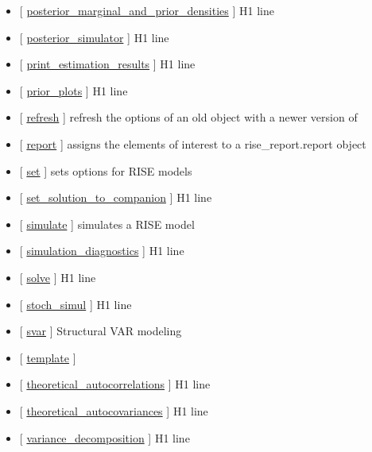\documentclass[letterpaper,10pt,english]{sphinxmanual}
\begin{document}
\begin{itemize}
\item {} 
{[} {\hyperref[classes/models/@svar/svar:posterior-marginal-and-prior-densities]{posterior\_marginal\_and\_prior\_densities}} {]}   H1 line

\item {} 
{[} {\hyperref[classes/models/@svar/svar:posterior-simulator]{posterior\_simulator}} {]}   H1 line

\item {} 
{[} {\hyperref[classes/models/@svar/svar:print-estimation-results]{print\_estimation\_results}} {]}   H1 line

\item {} 
{[} {\hyperref[classes/models/@svar/svar:prior-plots]{prior\_plots}} {]}   H1 line

\item {} 
{[} {\hyperref[classes/models/@svar/svar:refresh]{refresh}} {]}  refresh the options of an old object with a newer version of

\item {} 
{[} {\hyperref[classes/models/@svar/svar:report]{report}} {]} assigns the elements of interest to a rise\_report.report object

\item {} 
{[} {\hyperref[classes/models/@svar/svar:set]{set}} {]}  sets options for RISE models

\item {} 
{[} {\hyperref[classes/models/@svar/svar:set-solution-to-companion]{set\_solution\_to\_companion}} {]}   H1 line

\item {} 
{[} {\hyperref[classes/models/@svar/svar:simulate]{simulate}} {]}  simulates a RISE model

\item {} 
{[} {\hyperref[classes/models/@svar/svar:simulation-diagnostics]{simulation\_diagnostics}} {]}   H1 line

\item {} 
{[} {\hyperref[classes/models/@svar/svar:solve]{solve}} {]}   H1 line

\item {} 
{[} {\hyperref[classes/models/@svar/svar:stoch-simul]{stoch\_simul}} {]}   H1 line

\item {} 
{[} {\hyperref[classes/models/@svar/svar:svar]{svar}} {]} Structural VAR modeling

\item {} 
{[} {\hyperref[classes/models/@svar/svar:template]{template}} {]}

\item {} 
{[} {\hyperref[classes/models/@svar/svar:theoretical-autocorrelations]{theoretical\_autocorrelations}} {]}   H1 line

\item {} 
{[} {\hyperref[classes/models/@svar/svar:theoretical-autocovariances]{theoretical\_autocovariances}} {]}   H1 line

\item {} 
{[} {\hyperref[classes/models/@svar/svar:variance-decomposition]{variance\_decomposition}} {]}   H1 line

\end{itemize}
\end{document}
